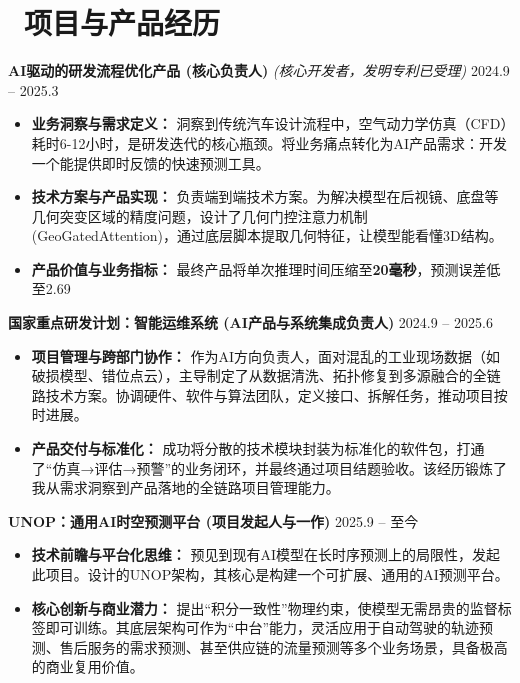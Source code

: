 \documentclass[11pt]{article}
\newlength{\interProjectSpacing}
\newcommand{\projectsep}{\vspace{\interProjectSpacing}}
\begin{document}

\section{\makebox[\widthof{\faUsers}][c]{\color{CVBlue}\faUsers}\ 
项目与产品经历}
\textbf{AI驱动的研发流程优化产品 (核心负责人)} 
\textit{(核心开发者，发明专利已受理)} 
\hfill 2024.9 -- 2025.3
\begin{itemize}
    \item \textbf{业务洞察与需求定义：} 洞察到传统汽车设计流程中，空气动力学仿真（CFD）耗时6-12小时，是研发迭代的核心瓶颈。将业务痛点转化为AI产品需求：开发一个能提供即时反馈的快速预测工具。
    \item \textbf{技术方案与产品实现：} 负责端到端技术方案。为解决模型在后视镜、底盘等几何突变区域的精度问题，设计了几何门控注意力机制(GeoGatedAttention)，通过底层脚本提取几何特征，让模型能看懂3D结构。
    \item \textbf{产品价值与业务指标：} 最终产品将单次推理时间压缩至\textbf{20毫秒}，预测误差低至2.69%
\end{itemize}
\projectsep

\textbf{国家重点研发计划：智能运维系统 (AI产品与系统集成负责人)} 
\hfill 2024.9 -- 2025.6
\begin{itemize}
    \item \textbf{项目管理与跨部门协作：} 作为AI方向负责人，面对混乱的工业现场数据（如破损模型、错位点云），主导制定了从数据清洗、拓扑修复到多源融合的全链路技术方案。协调硬件、软件与算法团队，定义接口、拆解任务，推动项目按时进展。
    \item \textbf{产品交付与标准化：} 成功将分散的技术模块封装为标准化的软件包，打通了“仿真→评估→预警”的业务闭环，并最终通过项目结题验收。该经历锻炼了我从需求洞察到产品落地的全链路项目管理能力。
\end{itemize}

\projectsep
\textbf{UNOP：通用AI时空预测平台 (项目发起人与一作)} 
\hfill 2025.9 -- 至今
\begin{itemize}
    \item \textbf{技术前瞻与平台化思维：} 预见到现有AI模型在长时序预测上的局限性，发起此项目。设计的UNOP架构，其核心是构建一个可扩展、通用的AI预测平台。
    \item \textbf{核心创新与商业潜力：} 提出“积分一致性”物理约束，使模型无需昂贵的监督标签即可训练。其底层架构可作为“中台”能力，灵活应用于自动驾驶的轨迹预测、售后服务的需求预测、甚至供应链的流量预测等多个业务场景，具备极高的商业复用价值。
\end{itemize}
\end{document}
